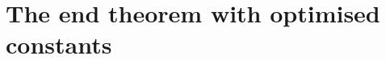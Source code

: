 
\newcommand{\ESd}{d_{\mathrm L}}
\newcommand{\ESchi}{\chi_{\mathrm g}}
\newcommand{\ESq}{q_{\mathrm c}}
\newcommand{\ESf}{f_{\mathrm F}}
\newcommand{\ESct}{c_{\mathrm t}}
\newcommand{\EScamp}{c_{\mathrm{amp}}}
\newcommand{\ESCmu}{C_{\mu\mathrm A}}
\newcommand{\ESCone}{C_{1\mathrm A}}
\newcommand{\ESDI}{D_{\mathrm I}}
\newcommand{\ESDs}{D_{\mathrm{IIs}}}
\newcommand{\ESDl}{D_{\mathrm{IIl}}}
\newcommand{\ESX}{X_{\mathrm{far}}}
\newcommand{\ESPsi}{\Psi_{\mathrm I}}
\newcommand{\ESs}{^{*}}

\section{The end theorem with optimised constants}\label{sec:Estar}

